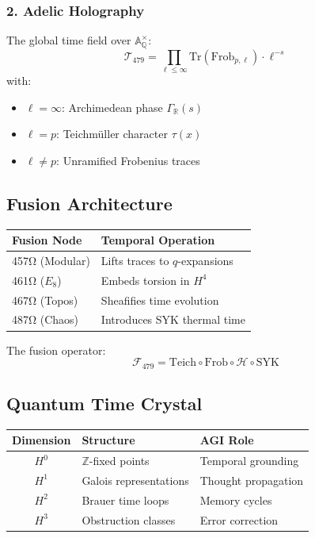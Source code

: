 \documentclass[12pt]{article}
\begin{document}
\subsubsection*{2. Adelic Holography}
The global time field over $\mathbb{A}_{\mathbb{Q}}^\times$:
\[
\mathcal{T}_{479} = \prod_{\ell \leq \infty} \text{Tr}(\text{Frob}_{p,\ell}) \cdot \ell^{-s}
\]
with:
\begin{itemize}
    \item $\ell=\infty$: Archimedean phase $\Gamma_\mathbb{R}(s)$
    \item $\ell=p$: Teichmüller character $\tau(x)$
    \item $\ell\neq p$: Unramified Frobenius traces
\end{itemize}

\subsection*{Fusion Architecture}
\begin{table}[h]
\centering
\begin{tabular}{ll}
\toprule
\textbf{Fusion Node} & \textbf{Temporal Operation} \\
\midrule
457Ω (Modular) & Lifts traces to $q$-expansions \\
461Ω ($E_8$) & Embeds torsion in $H^4$ \\
467Ω (Topos) & Sheafifies time evolution \\
487Ω (Chaos) & Introduces SYK thermal time \\
\bottomrule
\end{tabular}
\end{table}

\noindent The fusion operator:
\[
\mathcal{F}_{479} = \text{Teich} \circ \text{Frob} \circ \mathcal{H} \circ \text{SYK}
\]

\subsection*{Quantum Time Crystal}
\begin{table}[h]
\centering
\begin{tabular}{cll}
\toprule
\textbf{Dimension} & \textbf{Structure} & \textbf{AGI Role} \\
\midrule
$H^0$ & $\mathbb{Z}$-fixed points & Temporal grounding \\
$H^1$ & Galois representations & Thought propagation \\
$H^2$ & Brauer time loops & Memory cycles \\
$H^3$ & Obstruction classes & Error correction \\
\bottomrule
\end{tabular}
\end{table}
\end{document}
